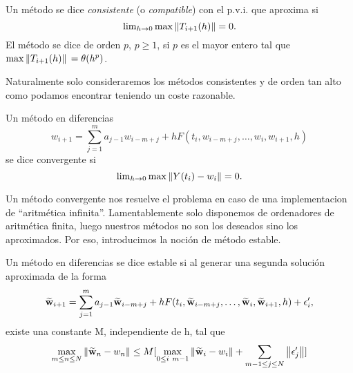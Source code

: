 \begin{definition}
    Un método se dice \emph{consistente} (o \emph{compatible})
    con el p.v.i. que aproxima si
    \begin{equation*}
        \lim\nolimits_{h\to 0} \max{\norm{T_{i+1}(h)}} = 0.
	\end{equation*}
	El método se dice de orden $p$, $p \geq 1$, si $p$ es el mayor entero
	tal que $\max{\norm*{T_{i+1}(h)}} = \theta(h^p)$.
\end{definition}

Naturalmente solo consideraremos los métodos consistentes y de orden tan
alto como podamos encontrar teniendo un coste razonable.

\begin{definition}
    Un método en diferencias
    \begin{equation*}
        w_{i+1} = \sum_{j=1}^m {a_{j-1}w_{i-m+j}}
            + hF(t_i,w_{i-m+j}, \dots, w_i,w_{i+1},h)
    \end{equation*}
    se dice convergente si
    \begin{equation*}
        \lim\nolimits_{h \to 0} \max{\norm{Y(t_i)-w_i}} = 0.
    \end{equation*}
\end{definition}

Un método convergente nos resuelve el problema en caso de una
implementacion de ``aritmética infinita''.
Lamentablemente solo disponemos de ordenadores de aritmética finita,
luego nuestros métodos no son los deseados sino los aproximados. %
Por eso, introducimos la noción de método estable.

\begin{definition}
    Un método en diferencias se dice estable
    si al generar una segunda solución aproximada de la forma
    \begin{equation*}
        \vb{\widetilde{w}}_{i+1} = \sum_{j=1}^m {a_{j-1}\vb{\widetilde{w}}_{i-m+j}}
            + h F(t_i,\vb{\widetilde{w}}_{i-m+j}, \dots, \vb{\widetilde{w}}_i,\vb{\widetilde{w}}_{i+1},h) + \epsilon'_i,
    \end{equation*}
    existe una constante M, independiente de h, tal que
    \begin{equation*} \label{stab}
        \max_{m \leq n \leq N}{\norm{\vb{\widetilde{w}}_n - w_n}} \leq M[
            \max_{0 \leq i \ m-1}{\norm{\vb{\widetilde{w}}_i - w_i}}
            + \sum_{m-1 \leq j \leq N} \norm{\epsilon'_j}
        ]
    \end{equation*}
\end{definition}

